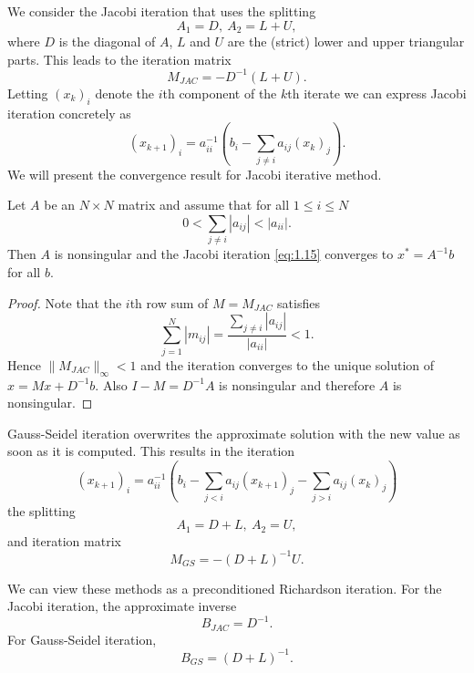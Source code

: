 \begin{exm}
  We consider the Jacobi iteration that uses the splitting $$A_1=D,\
  A_2=L+U,$$
  where $D$ is the diagonal of $A$, $L$ and $U$ are the (strict) lower
  and upper triangular parts. This leads to the iteration
  matrix $$M_{JAC}=-D^{-1}(L+U).$$
  Letting $(x_k)_i$ denote the $i$th component of the $k$th iterate we
  can express Jacobi iteration concretely as
  \begin{equation}
    \label{eq:1.15}
    (x_{k+1})_i = a_{ii}^{-1}\left( b_i-\sum\limits_{j\neq i}a_{ij}(x_k)_j\right).
  \end{equation}
  We will  present the convergence result for Jacobi iterative method.
  \begin{thm}
    Let $A$ be an $N\times N$ matrix and assume that for all $1\leq
    i\leq N$
    \begin{equation}
      \label{eq:1.16}
      0<\sum\limits_{j\neq i}|a_{ij}|<|a_{ii}|.
    \end{equation}
    Then $A$ is nonsingular and the Jacobi iteration \eqref{eq:1.15}
    converges to $x^*=A^{-1}b$ for all $b$.
  \end{thm}

  \begin{proof}
    Note that the $i$th row sum of $M=M_{JAC}$ satisfies
    $$\sum\limits_{j=1}^N|m_{ij}| = \frac{\sum_{j\neq
        i}|a_{ij}|}{|a_{ii}|}<1.$$
    Hence $\|M_{JAC}\|_{\infty}<1$ and the iteration converges to the
    unique solution of $x=Mx+D^{-1}b.$ Also $I-M = D^{-1}A$ is
    nonsingular and therefore $A$ is nonsingular.
  \end{proof}
\end{exm}

\begin{exm}
  Gauss-Seidel iteration overwrites the approximate solution with the
  new value as soon as it is computed. This results in the iteration
  $$(x_{k+1})_i=a_{ii}^{-1}\left(b_i-\sum\limits_{j<i}a_{ij}(x_{k+1})_j-
    \sum\limits_{j>i}a_{ij}(x_k)_j\right)$$
  the splitting $$A_1=D+L,\ A_2=U,$$
  and iteration matrix $$M_{GS}=-(D+L)^{-1}U.$$
\end{exm}

\begin{rmk}
  We can view these methods as a preconditioned Richardson
  iteration. For the Jacobi iteration, the approximate
  inverse $$B_{JAC}=D^{-1}.$$
  For Gauss-Seidel iteration,$$B_{GS}=(D+L)^{-1}.$$
\end{rmk}


